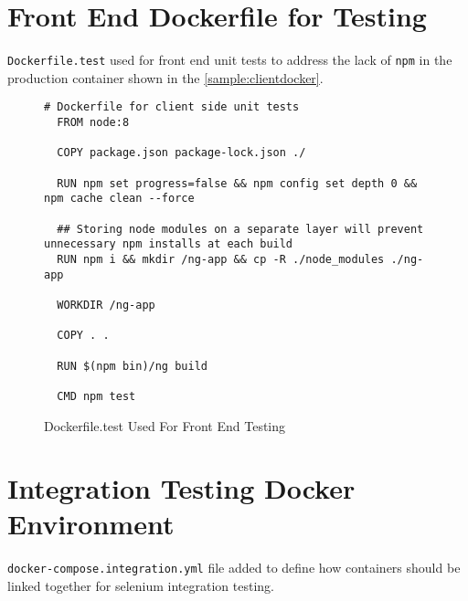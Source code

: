 \newpage
\section{Front End Dockerfile for Testing}
\texttt{Dockerfile.test} used for front end unit tests to address the lack of \texttt{npm}
in the production container shown in the \autoref{sample:clientdocker}.

\begin{figure}[ht]
  \begin{lstlisting}[basicstyle=\small, breaklines=true]
  # Dockerfile for client side unit tests
  FROM node:8

  COPY package.json package-lock.json ./

  RUN npm set progress=false && npm config set depth 0 && npm cache clean --force

  ## Storing node modules on a separate layer will prevent unnecessary npm installs at each build
  RUN npm i && mkdir /ng-app && cp -R ./node_modules ./ng-app

  WORKDIR /ng-app

  COPY . .

  RUN $(npm bin)/ng build

  CMD npm test
  \end{lstlisting}
  \caption{Dockerfile.test Used For Front End Testing}
  \label{sample:clientdockertest}
\end{figure}

\newpage
\section{Integration Testing Docker Environment}
\texttt{docker-compose.integration.yml} file added to define how containers should be
linked together for selenium integration testing.

